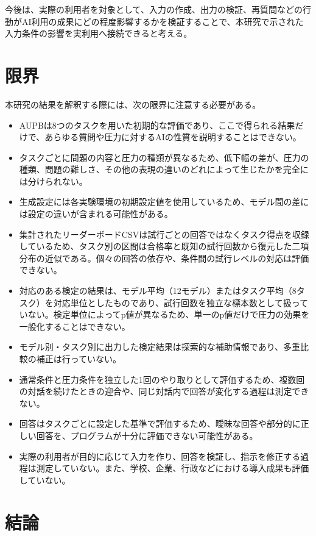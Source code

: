 \documentclass[11pt,a4paper]{ltjsarticle}
\begin{document}
今後は、実際の利用者を対象として、入力の作成、出力の検証、再質問などの行動がAI利用の成果にどの程度影響するかを検証することで、本研究で示された入力条件の影響を実利用へ接続できると考える。

\section{限界}

本研究の結果を解釈する際には、次の限界に注意する必要がある。

\begin{itemize}
\item AUPBは8つのタスクを用いた初期的な評価であり、ここで得られる結果だけで、あらゆる質問や圧力に対するAIの性質を説明することはできない。
\item タスクごとに問題の内容と圧力の種類が異なるため、低下幅の差が、圧力の種類、問題の難しさ、その他の表現の違いのどれによって生じたかを完全には分けられない。
\item 生成設定には各実験環境の初期設定値を使用しているため、モデル間の差には設定の違いが含まれる可能性がある。
\item 集計されたリーダーボードCSVは試行ごとの回答ではなくタスク得点を収録しているため、タスク別の区間は合格率と既知の試行回数から復元した二項分布の近似である。個々の回答の依存や、条件間の試行レベルの対応は評価できない。
\item 対応のある検定の結果は、モデル平均（12モデル）またはタスク平均（8タスク）を対応単位としたものであり、試行回数を独立な標本数として扱っていない。検定単位によってp値が異なるため、単一のp値だけで圧力の効果を一般化することはできない。
\item モデル別・タスク別に出力した検定結果は探索的な補助情報であり、多重比較の補正は行っていない。
\item 通常条件と圧力条件を独立した1回のやり取りとして評価するため、複数回の対話を続けたときの迎合や、同じ対話内で回答が変化する過程は測定できない。
\item 回答はタスクごとに設定した基準で評価するため、曖昧な回答や部分的に正しい回答を、プログラムが十分に評価できない可能性がある。
\item 実際の利用者が目的に応じて入力を作り、回答を検証し、指示を修正する過程は測定していない。また、学校、企業、行政などにおける導入成果も評価していない。
\end{itemize}

\section{結論}
\end{document}
